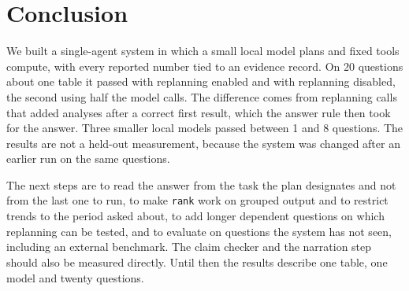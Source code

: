 \section{Conclusion}
We built a single-agent system in which a small local model plans and fixed tools compute, with every reported number tied to an evidence record. On 20 questions about one table it passed \MainQ{} with replanning enabled and \NoRepQ{} with replanning disabled, the second using half the model calls. The difference comes from replanning calls that added analyses after a correct first result, which the answer rule then took for the answer. Three smaller local models passed between 1 and 8 questions. The results are not a held-out measurement, because the system was changed after an earlier run on the same questions.

The next steps are to read the answer from the task the plan designates and not from the last one to run, to make \texttt{rank} work on grouped output and to restrict trends to the period asked about, to add longer dependent questions on which replanning can be tested, and to evaluate on questions the system has not seen, including an external benchmark. The claim checker and the narration step should also be measured directly. Until then the results describe one table, one model and twenty questions.
